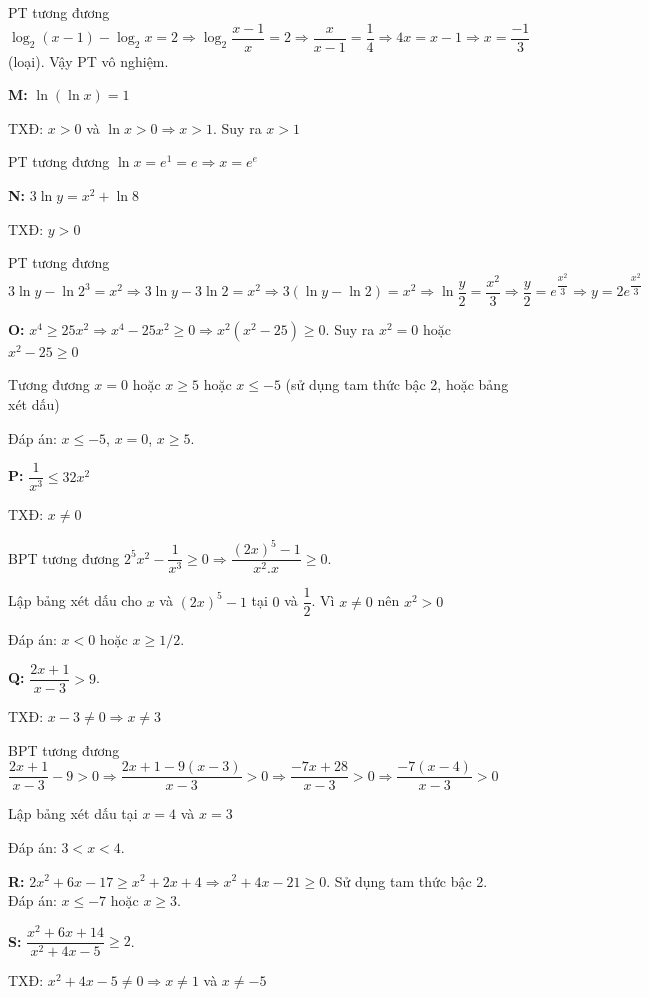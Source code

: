\documentclass[12pt,a4paper]{article}
\begin{document}
PT tương đương $\log_2{(x - 1)} - \log_2 x = 2 \Rightarrow \log_2{\dfrac{x - 1}{x}} = 2 \Rightarrow \dfrac{x}{x-1} = \dfrac{1}{4} \Rightarrow 4x = x - 1 \Rightarrow x = \dfrac{-1}{3}$ (loại). Vậy PT vô nghiệm.

\textbf{M:} $\ln(\ln x) = 1$

TXĐ: $x > 0$ và $\ln x > 0 \Rightarrow x > 1$. Suy ra $x > 1$

PT tương đương $\ln x = e^1 = e \Rightarrow x = e^e$

\textbf{N:} $3 \ln y = x^2 + \ln 8$

TXĐ: $y > 0$

PT tương đương $3\ln y - \ln 2^3 = x^2 \Rightarrow 3\ln y - 3\ln 2 = x^2 \Rightarrow 3(\ln y - \ln 2) = x^2 \Rightarrow \ln \dfrac{y}{2} = \dfrac{x^2}{3} \Rightarrow \dfrac{y}{2} = e^{\dfrac{x^2}{3}} \Rightarrow y = 2e^{\dfrac{x^2}{3}}$

\textbf{O:} $x^4 \ge 25x^2 \Rightarrow x^4 - 25x^2 \ge 0 \Rightarrow x^2(x^2 - 25) \ge 0$. Suy ra $x^2 = 0$ hoặc $x^2 - 25 \ge 0$

Tương đương $x = 0$ hoặc $x \ge 5$ hoặc $x \le -5$ (sử dụng tam thức bậc 2, hoặc bảng xét dấu)

Đáp án: $x \le -5$, $x=0$, $x \ge 5$.

\textbf{P:} $\dfrac{1}{x^3} \le 32x^2$

TXĐ: $x \ne 0$

BPT tương đương $2^5x^2 - \dfrac{1}{x^3} \ge 0 \Rightarrow \dfrac{(2x)^5 - 1}{x^2.x} \ge 0$.

Lập bảng xét dấu cho $x$ và $(2x)^5 - 1$ tại $0$ và $\dfrac{1}{2}$. Vì $x \ne 0$ nên $x^2 > 0$

Đáp án: $x < 0$ hoặc $x \ge 1/2$.

\textbf{Q:} $\dfrac{2x+1}{x-3} > 9$.

TXĐ: $x - 3 \ne 0 \Rightarrow x \ne 3$

BPT tương đương $\dfrac{2x + 1}{x - 3} - 9 > 0 \Rightarrow \dfrac{2x + 1 - 9(x - 3)}{x - 3} > 0 \Rightarrow \dfrac{-7x + 28}{x - 3} > 0 \Rightarrow \dfrac{-7(x - 4)}{x - 3} > 0$

Lập bảng xét dấu tại $x = 4$ và $x = 3$

Đáp án: $3 < x < 4$.

\textbf{R:} $2x^2+6x-17 \ge x^2+2x+4 \Rightarrow x^2 + 4x - 21 \ge 0$. Sử dụng tam thức bậc 2. Đáp án: $x \le -7$ hoặc $x \ge 3$.

\textbf{S:} $\dfrac{x^2+6x+14}{x^2+4x-5} \ge 2$.

TXĐ: $x^2 + 4x - 5 \ne 0 \Rightarrow x \ne 1$ và $x \ne -5$
\end{document}
